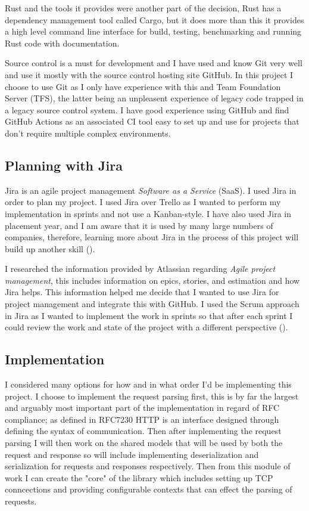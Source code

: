 \documentclass[12pt, a4paper]{article}
\begin{document}
Rust and the tools it provides were another part of the decision, Rust has a dependency management
tool called Cargo, but it does more than this it provides a high level command line interface for 
build, testing, benchmarking and running Rust code with documentation.

Source control is a must for development and I have used and know Git very well and use it mostly
with the source control hosting site GitHub. In this project I choose to use Git as I only have
experience with this and Team Foundation Server (TFS), the latter being an unpleasent experience of
legacy code trapped in a legacy source control system. I have good experience using GitHub and
find GitHub Actions as an associated CI tool easy to set up and use for projects that don't require
multiple complex environments. 

\subsection{Planning with Jira}

Jira is an agile project management \emph{Software as a Service} (SaaS). I used Jira in order to
plan my project. I used Jira over Trello as I wanted to perform my implementation in
sprints and not use a Kanban-style. I have also used Jira in placement year, and I am aware that it 
is used by many large numbers of companies, therefore, learning more about Jira in the process of this 
project will build up another skill (\cite{jira}).

I researched the information provided by Atlassian regarding \emph{Agile project management},
this includes information on epics, stories, and estimation and how Jira helps. This information
helped me decide that I wanted to use Jira for project management and integrate this with GitHub.
I used the Scrum approach in Jira as I wanted to implement the work in sprints so that after each
sprint I could review the work and state of the project with a different perspective
(\cite{jira-agile-info}). 

\subsection{Implementation}

I considered many options for how and in what order I'd be implementing this project. I choose
to implement the request parsing first, this is by far the largest and arguably most important part
of the implementation in regard of RFC compliance; as defined in RFC7230 HTTP is an interface designed
through defining the syntax of communication. Then after implementing the request parsing I will then
work on the shared models that will be used by both the request and response so will include implementing
deserialization and serialization for requests and responses respectively. Then from this module of
work I can create the "core" of the library which includes setting up TCP conncections and providing
configurable contexts that can effect the parsing of requests. 
\end{document}
